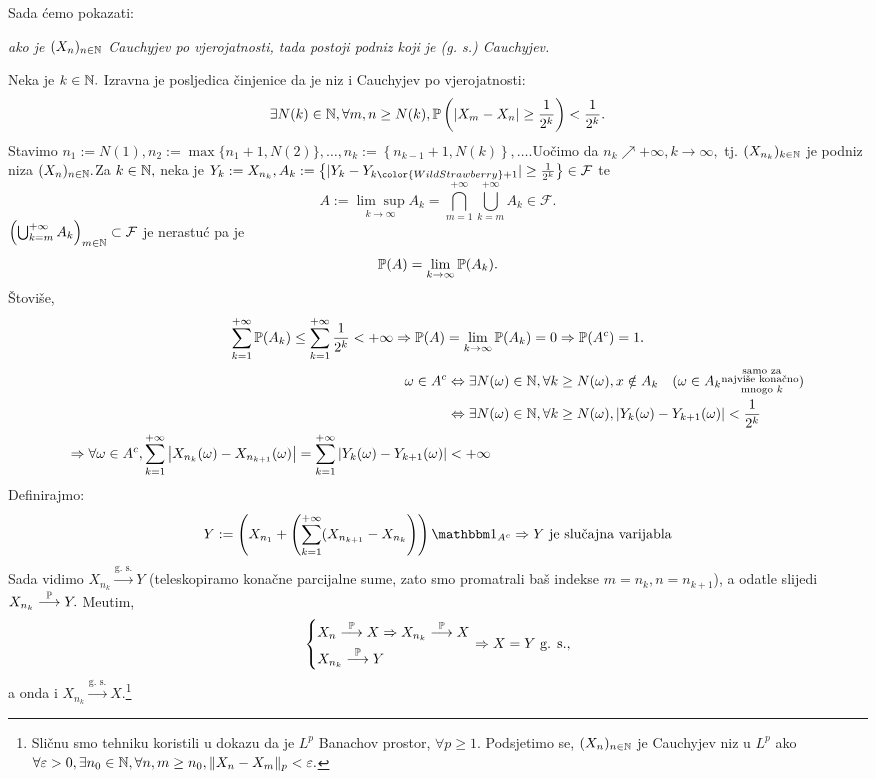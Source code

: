 \documentclass{article}
\begin{document}
Sada ćemo pokazati: \begin{center}\emph{ako je \((X_n)_{n\in\Bbb N}\) Cauchyjev po vjerojatnosti, tada postoji podniz koji je (g. s.) Cauchyjev.}\end{center} Neka je \(k\in\Bbb N.\) Izravna je posljedica činjenice da je niz i Cauchyjev po vjerojatnosti:\[\exists N(k)\in\Bbb N,\forall m,n\ge N(k),\Bbb P\left(|X_m-X_n|\ge\frac1{2^k}\right)<\frac1{2^k}.\] Stavimo \(n_1:=N(1),n_2:=\max\{n_1+1,N(2)\},\ldots, n_k:=\left\{n_{k-1}+1,N(k)\right\},\ldots\).\newline Uočimo da \(n_k\nearrow+\infty,k\to\infty,\) tj. \((X_{n_k})_{k\in\Bbb N}\) je podniz niza \((X_n)_{n\in\Bbb N}.\)\newline Za \(k\in\Bbb N,\) neka je \(Y_k:=X_{n_k},A_k:=\left\{|Y_k-Y_{k{\color{WildStrawberry}+1}}|\ge\frac1{2^k}\right\}\in\mathcal F\) te \[A:=\underset{k\to\infty}{\lim\sup}A_k=\bigcap_{m=1}^{+\infty}\bigcup_{k=m}^{+\infty}A_k\in\mathcal F.\] \(\left(\bigcup_{k=m}^{+\infty}A_k\right)_{m\in\Bbb N}\subset\mathcal F\) je nerastuć pa je \[\Bbb P(A)=\lim_{k\to\infty}\Bbb P(A_k).\] Štoviše, \[\sum_{k=1}^{+\infty}\Bbb P(A_k)\le\sum_{k=1}^{+\infty}\frac1{2^k}<+\infty\Rightarrow\Bbb P(A)=\lim_{k\to\infty}\Bbb P(A_k)=0\Rightarrow\Bbb P(A^c)=1.\] 
\[\begin{aligned}\omega\in A^c&\Leftrightarrow \exists N(\omega)\in\Bbb N,\forall k\ge N(\omega), x\notin A_k\quad(\omega\in A_k\substack{\text{ samo za}\\\text{najviše konačno}\\\text{ mnogo }k})\\&\Leftrightarrow\exists N(\omega)\in\Bbb N,\forall k\ge N(\omega),|Y_k(\omega)-Y_{k+1}(\omega)|<\frac1{2^k}\\\Rightarrow\forall\omega\in A^c,\sum_{k=1}^{+\infty}\left|X_{n_k}(\omega)-X_{n_{k+1}}(\omega)\right|=\sum_{k=1}^{+\infty}|Y_k(\omega)-Y_{k+1}(\omega)|&<+\infty\end{aligned}\] Definirajmo: \[Y:=\left(X_{n_1}+\left(\sum_{k=1}^{+\infty}(X_{n_{k+1}}-X_{n_k}\right)\right)\mathbbm 1_{A^c}\Rightarrow Y\text{ je slučajna varijabla}\] Sada vidimo \(X_{n_k}\overset{\text{g. s.}}{\longrightarrow}Y\) (teleskopiramo konačne parcijalne sume, zato smo promatrali baš indekse \(m=n_{k},n=n_{k+1}\)), a odatle slijedi \(X_{n_k}\overset{\Bbb P}{\longrightarrow}Y.\) Me\dj{}utim, \[\begin{dcases}X_n\overset{\Bbb P}{\longrightarrow}X\Rightarrow X_{n_k}\overset{\Bbb P}{\longrightarrow} X\\X_{n_k}\overset{\Bbb P}{\longrightarrow}Y\end{dcases}\Rightarrow X=Y\text{ g. s.},\] a onda i \(X_{n_k}\overset{\text{g. s.}}{\longrightarrow}X.\)\footnote[11]{Sličnu smo tehniku koristili u dokazu da je \(L^p\) Banachov prostor, \(\forall p\ge 1.\) Podsjetimo se, \((X_n)_{n\in\Bbb N}\) je Cauchyjev niz u \(L^p\) ako \(\forall\varepsilon>0,\exists n_0\in\Bbb N,\forall n,m\ge n_0,\|X_n-X_m\|_p<\varepsilon.\)}\newline\newline
\end{document}
